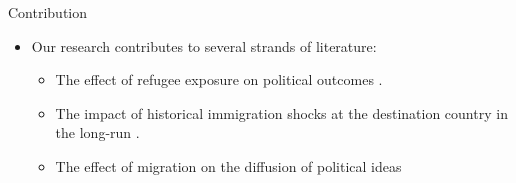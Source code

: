 \documentclass[10pt]{beamer}
\begin{document}
\begin{frame}{Contribution}




\begin{itemize}
    \item Our research contributes to several strands of literature:
    \begin{itemize}
        \item The effect of refugee exposure on political outcomes \textcolor{gray}{\citep{halla_immigration_2017, dustmann_refugee_2018,hangartner_refugee_2019, edo_immigration_2019, steinmayr_contact_2021, alesina_political_2024}}. %
        \item The impact of historical immigration shocks at the destination country in the long-run \textcolor{gray}{\citep{tabellini_gifts_2020, schindler_shocking_2021,bursztyn_immigrant_2024, chevalier_forced_2024, ochsner_activated_2024, toews_enemies_2025}}. %
        \item The effect of migration on the diffusion of political ideas \textcolor{gray}{\citep{spilimbergo_democracy_2009, barsbai_effect_2017,dippel_leadership_2021, calderon_racial_2023, bazzi_confederate_2023}}   %
    \end{itemize}
\end{itemize}





\end{frame}
\end{document}
